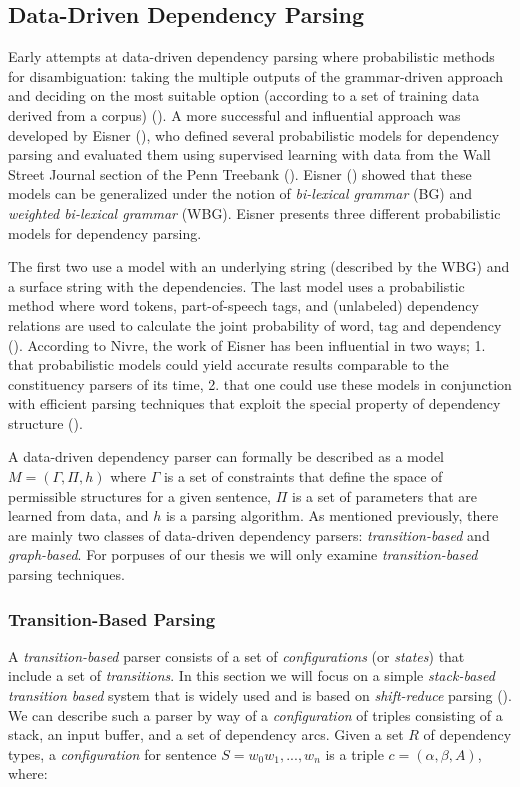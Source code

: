 \documentclass[10pt]{article}
\begin{document}
\subsection{Data-Driven Dependency Parsing}
Early attempts at data-driven dependency parsing where probabilistic methods for disambiguation: taking the multiple outputs of the grammar-driven approach and deciding on the most suitable option (according to a set of training data derived from a corpus) (\cite{Nivre05dependencygrammar}). A more successful and influential approach was developed by Eisner (\cite{eisner1996_a_empirical}), who defined several probabilistic models for dependency parsing and evaluated them using supervised learning with data from the Wall Street Journal section of the Penn Treebank (\cite{penn-treebank}). Eisner (\cite{eisner2000bilexical}) showed that these models can be generalized under the notion of \textit{bi-lexical grammar} (BG) and \textit{weighted bi-lexical grammar} (WBG). Eisner presents three different probabilistic models for dependency parsing.

The first two use a model with an underlying string (described by the WBG) and a surface string with the dependencies. The last model uses a probabilistic method where word tokens, part-of-speech tags, and (unlabeled) dependency relations are used to calculate the joint probability of word, tag and dependency (\cite{eisner2000bilexical}). According to Nivre, the work of Eisner has been influential in two ways; 1. that probabilistic models could yield accurate results comparable to the constituency parsers of its time, 2. that one could use these models in conjunction with efficient parsing techniques that exploit the special property of dependency structure (\cite{Nivre05dependencygrammar}).

A data-driven dependency parser can formally be described as a model $M = (\Gamma, \Pi, h)$ where $\Gamma$ is a set of constraints that define the space of permissible structures for a given sentence, $\Pi$ is a set of parameters that are learned from data, and $h$ is a parsing algorithm. As mentioned previously, there are mainly two classes of data-driven dependency parsers: \textit{transition-based} and \textit{graph-based}. For porpuses of our thesis we will only examine \textit{transition-based} parsing techniques.

\subsubsection{Transition-Based Parsing}
A \textit{transition-based} parser consists of a set of \textit{configurations} (or \textit{states}) that include a set of \textit{transitions}. In this section we will focus on a simple \textit{stack-based} \textit{transition based} system that is widely used and is based on \textit{shift-reduce} parsing (\cite{kubler-sandra-mcdonald-ryan-nivre-book}). We can describe such a parser by way of a \textit{configuration} of triples consisting of a stack, an input buffer, and a set of dependency arcs. Given a set $R$ of dependency types, a \textit{configuration} for sentence $S = w_0w_1, ..., w_n$ is a triple $c = (\alpha, \beta, A)$, where:
\end{document}
